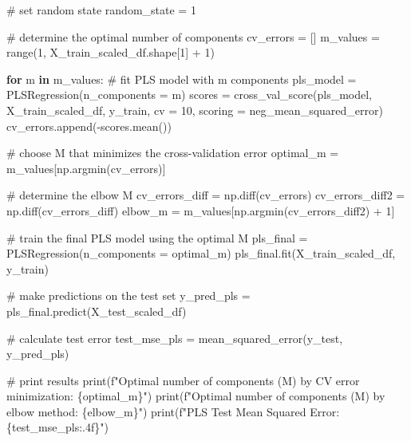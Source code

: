\documentclass[
  letterpaper,
  DIV=11,
  numbers=noendperiod]{scrartcl}
\newenvironment{Shaded}{\begin{snugshade}}{\end{snugshade}}
\newcommand{\BuiltInTok}[1]{\textcolor[rgb]{0.00,0.23,0.31}{#1}}
\newcommand{\CommentTok}[1]{\textcolor[rgb]{0.37,0.37,0.37}{#1}}
\newcommand{\ControlFlowTok}[1]{\textcolor[rgb]{0.00,0.23,0.31}{\textbf{#1}}}
\newcommand{\DecValTok}[1]{\textcolor[rgb]{0.68,0.00,0.00}{#1}}
\newcommand{\KeywordTok}[1]{\textcolor[rgb]{0.00,0.23,0.31}{\textbf{#1}}}
\newcommand{\NormalTok}[1]{\textcolor[rgb]{0.00,0.23,0.31}{#1}}
\newcommand{\OperatorTok}[1]{\textcolor[rgb]{0.37,0.37,0.37}{#1}}
\newcommand{\SpecialCharTok}[1]{\textcolor[rgb]{0.37,0.37,0.37}{#1}}
\newcommand{\SpecialStringTok}[1]{\textcolor[rgb]{0.13,0.47,0.30}{#1}}
\newcommand{\StringTok}[1]{\textcolor[rgb]{0.13,0.47,0.30}{#1}}
\begin{document}
\begin{Shaded}
\begin{Highlighting}[]
\CommentTok{\# set random state }
\NormalTok{random\_state }\OperatorTok{=} \DecValTok{1}

\CommentTok{\# determine the optimal number of components }
\NormalTok{cv\_errors }\OperatorTok{=}\NormalTok{ []}
\NormalTok{m\_values }\OperatorTok{=} \BuiltInTok{range}\NormalTok{(}\DecValTok{1}\NormalTok{, X\_train\_scaled\_df.shape[}\DecValTok{1}\NormalTok{] }\OperatorTok{+} \DecValTok{1}\NormalTok{)}

\ControlFlowTok{for}\NormalTok{ m }\KeywordTok{in}\NormalTok{ m\_values:}
    \CommentTok{\# fit PLS model with m components}
\NormalTok{    pls\_model }\OperatorTok{=}\NormalTok{ PLSRegression(n\_components }\OperatorTok{=}\NormalTok{ m)}
\NormalTok{    scores }\OperatorTok{=}\NormalTok{ cross\_val\_score(pls\_model, X\_train\_scaled\_df, y\_train, }
\NormalTok{                             cv }\OperatorTok{=} \DecValTok{10}\NormalTok{, scoring }\OperatorTok{=} \StringTok{\textquotesingle{}neg\_mean\_squared\_error\textquotesingle{}}\NormalTok{)}
\NormalTok{    cv\_errors.append(}\OperatorTok{{-}}\NormalTok{scores.mean()) }

\CommentTok{\# choose M that minimizes the cross{-}validation error}
\NormalTok{optimal\_m }\OperatorTok{=}\NormalTok{ m\_values[np.argmin(cv\_errors)]}

\CommentTok{\# determine the elbow M }
\NormalTok{cv\_errors\_diff }\OperatorTok{=}\NormalTok{ np.diff(cv\_errors)  }
\NormalTok{cv\_errors\_diff2 }\OperatorTok{=}\NormalTok{ np.diff(cv\_errors\_diff) }
\NormalTok{elbow\_m }\OperatorTok{=}\NormalTok{ m\_values[np.argmin(cv\_errors\_diff2) }\OperatorTok{+} \DecValTok{1}\NormalTok{] }

\CommentTok{\# train the final PLS model using the optimal M}
\NormalTok{pls\_final }\OperatorTok{=}\NormalTok{ PLSRegression(n\_components }\OperatorTok{=}\NormalTok{ optimal\_m)}
\NormalTok{pls\_final.fit(X\_train\_scaled\_df, y\_train)}

\CommentTok{\# make predictions on the test set}
\NormalTok{y\_pred\_pls }\OperatorTok{=}\NormalTok{ pls\_final.predict(X\_test\_scaled\_df)}

\CommentTok{\# calculate test error }
\NormalTok{test\_mse\_pls }\OperatorTok{=}\NormalTok{ mean\_squared\_error(y\_test, y\_pred\_pls)}

\CommentTok{\# print results}
\BuiltInTok{print}\NormalTok{(}\SpecialStringTok{f"Optimal number of components (M) by CV error minimization: }\SpecialCharTok{\{}\NormalTok{optimal\_m}\SpecialCharTok{\}}\SpecialStringTok{"}\NormalTok{)}
\BuiltInTok{print}\NormalTok{(}\SpecialStringTok{f"Optimal number of components (M) by elbow method: }\SpecialCharTok{\{}\NormalTok{elbow\_m}\SpecialCharTok{\}}\SpecialStringTok{"}\NormalTok{)}
\BuiltInTok{print}\NormalTok{(}\SpecialStringTok{f"PLS Test Mean Squared Error: }\SpecialCharTok{\{}\NormalTok{test\_mse\_pls}\SpecialCharTok{:.4f\}}\SpecialStringTok{"}\NormalTok{)}
\end{Highlighting}
\end{Shaded}
\end{document}
